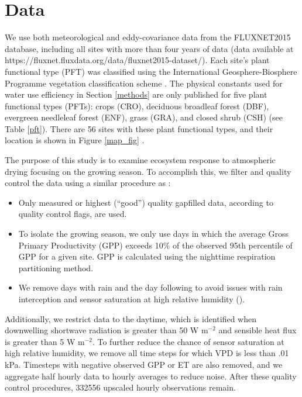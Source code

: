 \documentclass[draft,linenumbers]{agujournal}
\begin{document}
\section{Data}
\label{data}
We use both meteorological and eddy-covariance data from the FLUXNET2015 database, including all sites with more than four years of data (data available at https://fluxnet.fluxdata.org/data/fluxnet2015-dataset/). Each site's plant functional type (PFT) was classified using the International Geosphere-Biosphere Programme vegetation classification scheme \citep{Loveland_1999}. The physical constants used for water use efficiency in Section \ref{methods} are only published for five plant functional types (PFTs): crops (CRO), deciduous broadleaf forest (DBF), evergreen needleleaf forest (ENF), grass (GRA), and closed shrub (CSH) (see Table \ref{pft}). There are 56 sites with these plant functional types, and their location is shown in  Figure \ref{map_fig} .

The purpose of this study is to examine ecosystem response to atmospheric drying focusing on the growing season. To accomplish this, we filter and quality control the data using a similar procedure as \cite{Zhou_2015}:
\begin{itemize}
\item Only measured or highest (``good'') quality gapfilled data, according to quality control flags, are used.
\item To isolate the growing season, we only use days in which the average Gross Primary Productivity (GPP) exceeds 10\% of the observed 95th percentile of GPP for a given site. GPP is calculated using the nighttime respiration partitioning method.
\item We remove days with rain and the day following to avoid issues with rain interception and sensor saturation at high relative humidity (\cite{MEDLYN_2011}).
\end{itemize}
Additionally, we restrict data to the daytime, which is identified when downwelling shortwave radiation is greater than 50 W m$^{-2}$ and sensible heat flux is greater than 5 W m$^{-2}$. To further reduce the chance of sensor saturation at high relative humidity, we remove all time steps for which VPD is less than .01 kPa. Timesteps with negative observed GPP or ET are also removed, and we aggregate half hourly data to hourly averages to reduce noise. After these quality control procedures, 332556 upscaled hourly observations remain. 
\end{document}
